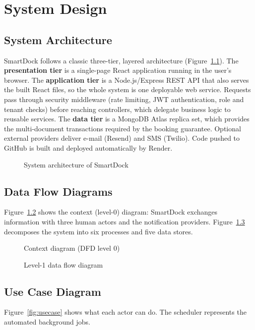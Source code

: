 \chapter{System Design}


\section{System Architecture}
SmartDock follows a classic three-tier, layered architecture (Figure~\ref{fig:arch}). The \textbf{presentation tier} is a single-page React application running in the user's browser. The \textbf{application tier} is a Node.js/Express REST API that also serves the built React files, so the whole system is one deployable web service. Requests pass through security middleware (rate limiting, JWT authentication, role and tenant checks) before reaching controllers, which delegate business logic to reusable services. The \textbf{data tier} is a MongoDB Atlas replica set, which provides the multi-document transactions required by the booking guarantee. Optional external providers deliver e-mail (Resend) and SMS (Twilio). Code pushed to GitHub is built and deployed automatically by Render.

\begin{figure}[!htbp]
\centering

\caption{System architecture of SmartDock}
\label{fig:arch}
\end{figure}

\section{Data Flow Diagrams}
Figure~\ref{fig:dfd0} shows the context (level-0) diagram: SmartDock exchanges information with three human actors and the notification providers. Figure~\ref{fig:dfd1} decomposes the system into six processes and five data stores.

\begin{figure}[!htbp]
\centering

\caption{Context diagram (DFD level 0)}
\label{fig:dfd0}
\end{figure}

\begin{figure}[!htbp]
\centering

\caption{Level-1 data flow diagram}
\label{fig:dfd1}
\end{figure}

\section{Use Case Diagram}
Figure~\ref{fig:usecase} shows what each actor can do. The scheduler represents the automated background jobs.

